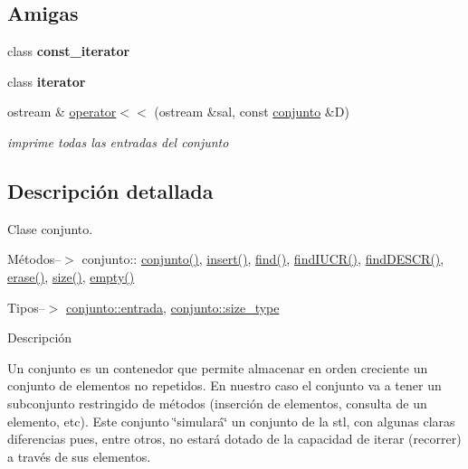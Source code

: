 \subsection*{Amigas}
\begin{DoxyCompactItemize}
\item 
\hypertarget{classconjunto_ac220ce1c155db1ac44146c12d178056f}{}class {\bfseries const\+\_\+iterator}\label{classconjunto_ac220ce1c155db1ac44146c12d178056f}

\item 
\hypertarget{classconjunto_a67171474c4da6cc8efe0c7fafefd2b2d}{}class {\bfseries iterator}\label{classconjunto_a67171474c4da6cc8efe0c7fafefd2b2d}

\item 
ostream \& \hyperlink{classconjunto_ae54b721035471d372f29c0335c42734a}{operator$<$$<$} (ostream \&sal, const \hyperlink{classconjunto}{conjunto} \&D)
\begin{DoxyCompactList}\small\item\em imprime todas las entradas del conjunto \end{DoxyCompactList}\end{DoxyCompactItemize}


\subsection{Descripción detallada}
Clase conjunto. 

Métodos--$>$ conjunto\+:\+: \hyperlink{classconjunto_a16d987f42c679efab01748178ba45891}{conjunto()}, \hyperlink{classconjunto_aa65b9f7c4cb9bad6d4e40c1973095930}{insert()}, \hyperlink{classconjunto_a2459d07b15a25a474f1be8dc0038feb5}{find()}, \hyperlink{classconjunto_a50eb93f152dc973726d184733d7ecd98}{find\+I\+U\+C\+R()}, \hyperlink{classconjunto_a5190c59db573008cc48a8ce734954a96}{find\+D\+E\+S\+C\+R()}, \hyperlink{classconjunto_ad550177fa4454da3a10fa356417e39a7}{erase()}, \hyperlink{classconjunto_a863e1e106e35adda47e7c5e2067295b9}{size()}, \hyperlink{classconjunto_afcf4ff3ff3c1f83b63e901efebe93533}{empty()}

Tipos--$>$ \hyperlink{classconjunto_a09cad766dd65de73e51eae21f9d22585}{conjunto\+::entrada}, \hyperlink{classconjunto_a855a5893bb0f5a851ab2dbf2b8aa6cc7}{conjunto\+::size\+\_\+type}

Descripción

Un conjunto es un contenedor que permite almacenar en orden creciente un conjunto de elementos no repetidos. En nuestro caso el conjunto va a tener un subconjunto restringido de métodos (inserción de elementos, consulta de un elemento, etc). Este conjunto \char`\"{}simulará\char`\"{} un conjunto de la stl, con algunas claras diferencias pues, entre otros, no estará dotado de la capacidad de iterar (recorrer) a través de sus elementos.

